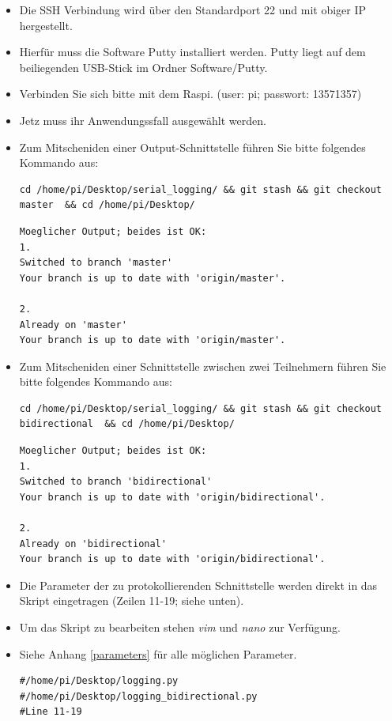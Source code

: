 \documentclass{article}
\begin{document}
\begin{itemize}
	\item Die SSH Verbindung wird über den Standardport 22 und mit obiger IP hergestellt.
	\item Hierfür muss die Software Putty installiert werden. Putty liegt auf dem beiliegenden USB-Stick im Ordner Software/Putty.
	\item Verbinden Sie sich bitte mit dem Raspi. (user: pi; passwort: 13571357)
	\item Jetz muss ihr Anwendungssfall ausgewählt werden. 
	\item Zum Mitscheniden einer Output-Schnittstelle führen Sie bitte folgendes Kommando aus:
\begin{lstlisting}
cd /home/pi/Desktop/serial_logging/ && git stash && git checkout master  && cd /home/pi/Desktop/
\end{lstlisting}
\begin{lstlisting}
Moeglicher Output; beides ist OK:
1.
Switched to branch 'master'
Your branch is up to date with 'origin/master'.

2.
Already on 'master'
Your branch is up to date with 'origin/master'.
\end{lstlisting}
	\item Zum Mitscheniden einer Schnittstelle zwischen zwei Teilnehmern führen Sie bitte folgendes Kommando aus:
\begin{lstlisting}
cd /home/pi/Desktop/serial_logging/ && git stash && git checkout bidirectional  && cd /home/pi/Desktop/
\end{lstlisting}
\begin{lstlisting}
Moeglicher Output; beides ist OK:
1.
Switched to branch 'bidirectional'
Your branch is up to date with 'origin/bidirectional'.

2.
Already on 'bidirectional'
Your branch is up to date with 'origin/bidirectional'.
\end{lstlisting}
	
	\item Die Parameter der zu protokollierenden Schnittstelle werden direkt in das Skript eingetragen (Zeilen 11-19; siehe unten).
	\item Um das Skript zu bearbeiten stehen \textit{vim} und \textit{nano} zur Verfügung. 
	\item Siehe Anhang \ref{parameters} für alle möglichen Parameter.

\begin{lstlisting}
#/home/pi/Desktop/logging.py
#/home/pi/Desktop/logging_bidirectional.py
#Line 11-19


\end{lstlisting}
\end{itemize}
\end{document}
